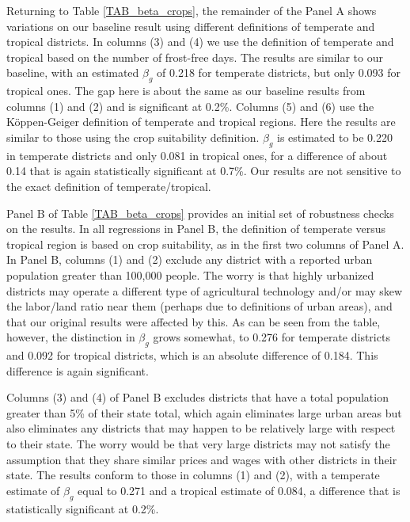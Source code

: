 \documentclass[11pt]{article}
\begin{document}
Returning to Table \ref{TAB_beta_crops}, the remainder of the Panel A shows variations on our baseline result using different definitions of temperate and tropical districts. In columns (3) and (4) we use the definition of temperate and tropical based on the number of frost-free days. The results are similar to our baseline, with an estimated $\beta_g$ of 0.218 for temperate districts, but only 0.093 for tropical ones. The gap here is about the same as our baseline results from columns (1) and (2) and is significant at 0.2\%. Columns (5) and (6) use the K{\"o}ppen-Geiger definition of temperate and tropical regions. Here the results are similar to those using the crop suitability definition. $\beta_g$ is estimated to be 0.220 in temperate districts and only 0.081 in tropical ones, for a difference of about 0.14 that is again statistically significant at 0.7\%. Our results are not sensitive to the exact definition of temperate/tropical.

Panel B of Table \ref{TAB_beta_crops} provides an initial set of robustness checks on the results. In all regressions in Panel B, the definition of temperate versus tropical region is based on crop suitability, as in the first two columns of Panel A. In Panel B, columns (1) and (2) exclude any district with a reported urban population greater than 100,000 people. The worry is that highly urbanized districts may operate a different type of agricultural technology and/or may skew the labor/land ratio near them (perhaps due to definitions of urban areas), and that our original results were affected by this. As can be seen from the table, however, the distinction in $\beta_g$ grows somewhat, to 0.276 for temperate districts and 0.092 for tropical districts, which is an absolute difference of 0.184. This difference is again significant.

Columns (3) and (4) of Panel B excludes districts that have a total population greater than 5\% of their state total, which again eliminates large urban areas but also eliminates any districts that may happen to be relatively large with respect to their state. The worry would be that very large districts may not satisfy the assumption that they share similar prices and wages with other districts in their state. The results conform to those in columns (1) and (2), with a temperate estimate of $\beta_g$ equal to 0.271 and a tropical estimate of 0.084, a difference that is statistically significant at 0.2\%. 
\end{document}
